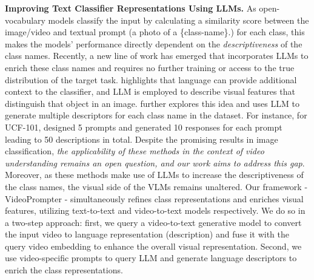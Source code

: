 \documentclass{article} \usepackage{iclr2024_conference,times}
\begin{document}
\textbf{Improving  Text Classifier Representations Using LLMs.}
As open-vocabulary models classify the input by calculating a similarity score between the image/video and textual prompt (a photo of a {\{class-name}\}.) for each class, this makes the models' performance directly dependent on the \emph{descriptiveness} of the class names. Recently, a new line of work has emerged \citep{menon2022visual,pratt2022does,roth2023waffling,novack2023chils} that incorporates LLMs to enrich these class names and requires no further
training or access to the true distribution of the target task. \citep{menon2022visual} highlights that language can provide additional context to the classifier, and LLM is employed to describe visual features that distinguish that object in an image. \citep{pratt2022does} further explores this idea and uses LLM to generate multiple descriptors for each class name in the dataset. For instance, for UCF-101, \citep{pratt2022does} designed 5 prompts and generated 10 responses for each prompt leading to 50 descriptions in total. Despite the promising results in image classification, \emph{the applicability of these methods \citep{menon2022visual,pratt2022does,roth2023waffling,novack2023chils} in the context of video understanding remains an open question, and our work aims to address this gap}. Moreover, as these methods make use of LLMs to increase the descriptiveness of the class names, the visual side of the VLMs remains unaltered. Our framework - VideoPrompter - simultaneously refines class representations and enriches visual features, utilizing text-to-text  \citep{brown2020language} and video-to-text models \citep{maaz2023video}  respectively. We do so in a two-step approach: first, we query a video-to-text generative model to convert the input video to language representation (description) and fuse it with the query video embedding to enhance the overall visual representation. Second, we use video-specific prompts to query LLM and generate language descriptors to enrich the class representations.
\end{document}
